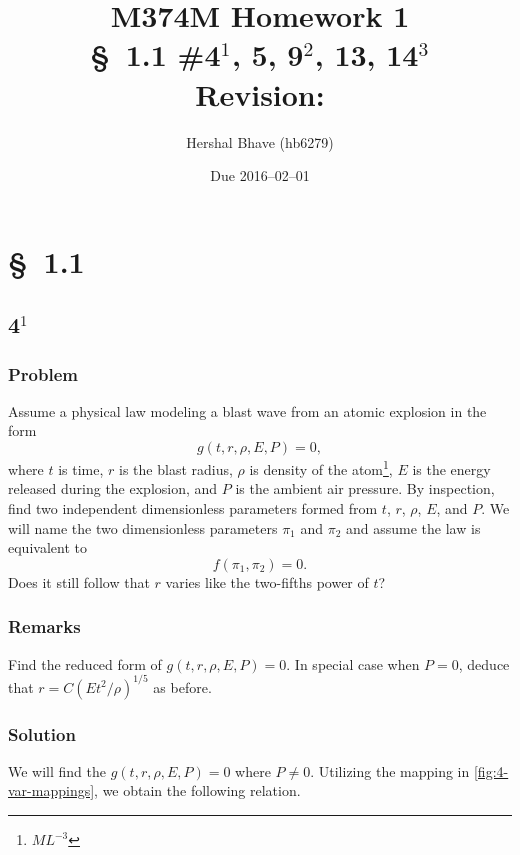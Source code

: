 \documentclass[12pt,twoside]{article}
\title{M374M Homework 1 \\
  \normalsize{\S~1.1 \#4$^1$, 5, 9$^2$, 13, 14$^3$} \\
  Revision: }
\author{Hershal Bhave (hb6279)}
\date{Due 2016--02--01}
\begin{document}
\maketitle

\section{\S~1.1}
\subsection{4$^1$}
  \subsubsection*{Problem}
  Assume a physical law modeling a blast wave from an atomic explosion in the
  form
  \begin{equation*}
    g(t,r,\rho,E,P)=0,
  \end{equation*}
  where $t$ is time, $r$ is the blast radius, $\rho$ is density of the
  atom\footnote{$ML^{-3}$}, $E$ is the energy released during the explosion, and
  $P$ is the ambient air pressure. By inspection, find two independent
  dimensionless parameters formed from $t$, $r$, $\rho$, $E$, and $P$. We will
  name the two dimensionless parameters $\pi_1$ and $\pi_2$ and assume the law
  is equivalent to
  \begin{equation*}
    f(\pi_1,\pi_2)=0.
  \end{equation*}
  Does it still follow that $r$ varies like the two-fifths power of $t$?

  \subsubsection*{Remarks}
  Find the reduced form of $g(t,r,\rho,E,P)=0$. In special case when $P=0$,
  deduce that $r=C{(Et^2/\rho)}^{1/5}$ as before.

  \subsubsection*{Solution}
  We will find the $g(t,r,\rho,E,P)=0$ where $P\ne0$. Utilizing the mapping in
  \cref{fig:4-var-mappings}, we obtain the following relation.
\end{document}
